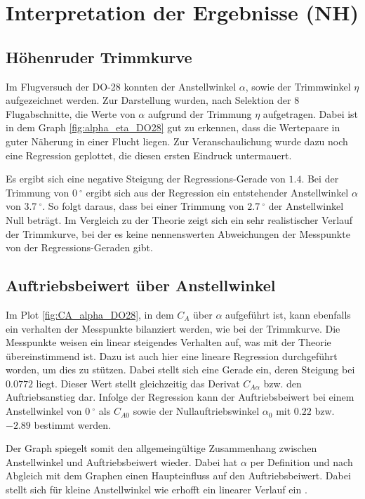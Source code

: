 \chapter{Interpretation der Ergebnisse (NH)}

\section{Höhenruder Trimmkurve}

Im Flugversuch der DO-28 konnten der Anstellwinkel $\alpha$, sowie der Trimmwinkel $\eta$ aufgezeichnet werden. Zur Darstellung wurden, nach Selektion der 8 Flugabschnitte, die Werte von $\alpha$ aufgrund der Trimmung $\eta$ aufgetragen. Dabei ist in dem Graph \ref{fig:alpha_eta_DO28} gut zu erkennen, dass die Wertepaare in guter Näherung in einer Flucht liegen. Zur Veranschaulichung wurde dazu noch eine Regression geplottet, die diesen ersten Eindruck untermauert.  

Es ergibt sich eine negative Steigung der Regressions-Gerade von $1.4$. Bei der Trimmung von $0 \ ^{\circ}$ ergibt sich aus der Regression ein entstehender Anstellwinkel $\alpha$ von $3.7 \ ^{\circ}$. So folgt daraus, dass bei einer Trimmung von $2.7 \ ^{\circ}$ der Anstellwinkel Null beträgt. Im Vergleich zu der Theorie zeigt sich ein sehr realistischer Verlauf der Trimmkurve, bei der es keine nennenswerten Abweichungen der Messpunkte von der Regressions-Geraden gibt.

\section{Auftriebsbeiwert über Anstellwinkel}

Im Plot \ref{fig:CA_alpha_DO28}, in dem $C_A$ über $\alpha$ aufgeführt ist, kann ebenfalls ein verhalten der Messpunkte bilanziert werden, wie bei der Trimmkurve. Die Messpunkte weisen ein linear steigendes Verhalten auf, was mit der Theorie übereinstimmend ist. Dazu ist auch hier eine lineare Regression durchgeführt worden, um dies zu stützen. Dabei stellt sich eine Gerade ein, deren Steigung bei $0.0772$ liegt. Dieser Wert stellt gleichzeitig das Derivat $C_{A\alpha}$ bzw. den Auftriebsanstieg dar. Infolge der Regression kann der Auftriebsbeiwert bei einem Anstellwinkel von $0 \ ^{\circ}$ als $C_{A0}$ sowie der Nullauftriebswinkel $\alpha_0$ mit $0.22$ bzw. $-2.89$ bestimmt werden.

Der Graph spiegelt somit den allgemeingültige Zusammenhang zwischen Anstellwinkel und Auftriebsbeiwert wieder. Dabei hat $\alpha$ per Definition und nach Abgleich mit dem Graphen einen Haupteinfluss auf den Auftriebsbeiwert. Dabei stellt sich für kleine Anstellwinkel wie erhofft ein linearer Verlauf ein \cite{Skript}.

